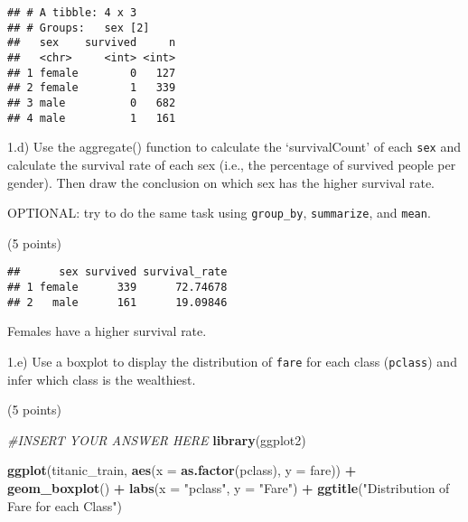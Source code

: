 \documentclass[
]{article}
\newenvironment{Shaded}{\begin{snugshade}}{\end{snugshade}}
\newcommand{\AttributeTok}[1]{\textcolor[rgb]{0.13,0.29,0.53}{#1}}
\newcommand{\CommentTok}[1]{\textcolor[rgb]{0.56,0.35,0.01}{\textit{#1}}}
\newcommand{\DecValTok}[1]{\textcolor[rgb]{0.00,0.00,0.81}{#1}}
\newcommand{\FunctionTok}[1]{\textcolor[rgb]{0.13,0.29,0.53}{\textbf{#1}}}
\newcommand{\NormalTok}[1]{#1}
\newcommand{\OtherTok}[1]{\textcolor[rgb]{0.56,0.35,0.01}{#1}}
\newcommand{\SpecialCharTok}[1]{\textcolor[rgb]{0.81,0.36,0.00}{\textbf{#1}}}
\newcommand{\StringTok}[1]{\textcolor[rgb]{0.31,0.60,0.02}{#1}}
\begin{document}
\begin{verbatim}
## # A tibble: 4 x 3
## # Groups:   sex [2]
##   sex    survived     n
##   <chr>     <int> <int>
## 1 female        0   127
## 2 female        1   339
## 3 male          0   682
## 4 male          1   161
\end{verbatim}

1.d) Use the aggregate() function to calculate the `survivalCount' of
each \texttt{sex} and calculate the survival rate of each sex (i.e., the
percentage of survived people per gender). Then draw the conclusion on
which sex has the higher survival rate.

OPTIONAL: try to do the same task using \texttt{group\_by},
\texttt{summarize}, and \texttt{mean}.

(5 points)

\begin{Shaded}
\end{Shaded}

\begin{verbatim}
##      sex survived survival_rate
## 1 female      339      72.74678
## 2   male      161      19.09846
\end{verbatim}

Females have a higher survival rate.

1.e) Use a boxplot to display the distribution of \texttt{fare} for each
class (\texttt{pclass}) and infer which class is the wealthiest.

(5 points)

\begin{Shaded}
\begin{Highlighting}[]
\CommentTok{\#INSERT YOUR ANSWER HERE}
\FunctionTok{library}\NormalTok{(ggplot2)}

\FunctionTok{ggplot}\NormalTok{(titanic\_train, }
       \FunctionTok{aes}\NormalTok{(}\AttributeTok{x =} \FunctionTok{as.factor}\NormalTok{(pclass), }\AttributeTok{y =}\NormalTok{ fare)) }\SpecialCharTok{+} \FunctionTok{geom\_boxplot}\NormalTok{() }\SpecialCharTok{+} 
  \FunctionTok{labs}\NormalTok{(}\AttributeTok{x =} \StringTok{"pclass"}\NormalTok{, }\AttributeTok{y =} \StringTok{"Fare"}\NormalTok{) }\SpecialCharTok{+} \FunctionTok{ggtitle}\NormalTok{(}\StringTok{"Distribution of Fare for each Class"}\NormalTok{)}
\end{Highlighting}
\end{Shaded}
\end{document}
